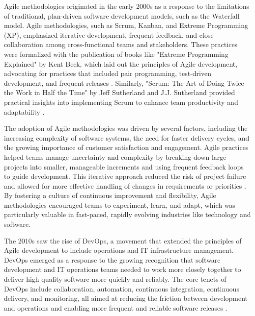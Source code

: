 \begin{refsection}
Agile methodologies originated in the early 2000s as a response to the limitations of traditional, plan-driven software development models, such as the Waterfall model. Agile methodologies, such as Scrum, Kanban, and Extreme Programming (XP), emphasized iterative development, frequent feedback, and close collaboration among cross-functional teams and stakeholders. These practices were formalized with the publication of books like "Extreme Programming Explained" by Kent Beck, which laid out the principles of Agile development, advocating for practices that included pair programming, test-driven development, and frequent releases \cite[pp.~1-4]{beck2004extreme}. Similarly, "Scrum: The Art of Doing Twice the Work in Half the Time" by Jeff Sutherland and J.J. Sutherland provided practical insights into implementing Scrum to enhance team productivity and adaptability \cite[pp.~22-25]{sutherland2014scrum}.

The adoption of Agile methodologies was driven by several factors, including the increasing complexity of software systems, the need for faster delivery cycles, and the growing importance of customer satisfaction and engagement. Agile practices helped teams manage uncertainty and complexity by breaking down large projects into smaller, manageable increments and using frequent feedback loops to guide development. This iterative approach reduced the risk of project failure and allowed for more effective handling of changes in requirements or priorities \cite[pp.~45-47]{rubin2014essential}. By fostering a culture of continuous improvement and flexibility, Agile methodologies encouraged teams to experiment, learn, and adapt, which was particularly valuable in fast-paced, rapidly evolving industries like technology and software.

The 2010s saw the rise of DevOps, a movement that extended the principles of Agile development to include operations and IT infrastructure management. DevOps emerged as a response to the growing recognition that software development and IT operations teams needed to work more closely together to deliver high-quality software more quickly and reliably. The core tenets of DevOps include collaboration, automation, continuous integration, continuous delivery, and monitoring, all aimed at reducing the friction between development and operations and enabling more frequent and reliable software releases \cite[pp.~35-37]{kim2021devops}.


\end{refsection}
